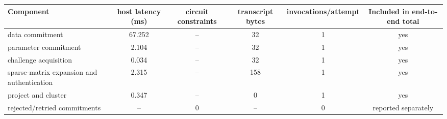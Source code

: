 \begin{tabular}{lccccc}
\toprule
Component & host latency (ms) & circuit constraints & transcript bytes & invocations/attempt & Included in end-to-end total \\
\midrule
data commitment & 67.252 & -- & 32 & 1 & yes \\
parameter commitment & 2.104 & -- & 32 & 1 & yes \\
challenge acquisition & 0.034 & -- & 32 & 1 & yes \\
sparse-matrix expansion and authentication & 2.315 & -- & 158 & 1 & yes \\
project and cluster & 0.347 & -- & 0 & 1 & yes \\
rejected/retried commitments & -- & 0 & -- & 0 & reported separately \\
\bottomrule
\end{tabular}

